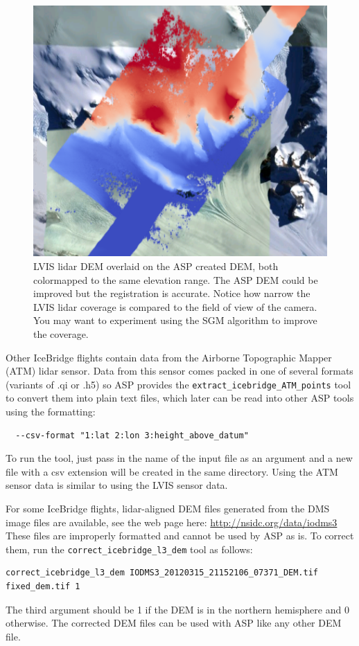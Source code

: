 \begin{figure}[h!]
\centering
  \includegraphics[width=5.5in]{images/examples/pinhole/icebridge_dem_overlay.png}
\caption{LVIS lidar DEM overlaid on the ASP created DEM, both colormapped to the same elevation range.
The ASP DEM could be improved but the registration is accurate.  Notice how narrow the LVIS lidar coverage
is compared to the field of view of the camera. You may want to experiment using the SGM algorithm to improve the coverage.}
\label{fig:pinhole-icebridge-orbitviz}
\end{figure}

Other IceBridge flights contain data from the Airborne Topographic Mapper (ATM) lidar sensor.  
Data from this sensor comes packed in one of several formats (variants of .qi or .h5) so
ASP provides the \texttt{extract\_icebridge\_ATM\_points} tool to convert them into plain
text files, which later can be read into other ASP tools using the formatting:
\begin{verbatim}
  --csv-format "1:lat 2:lon 3:height_above_datum"
\end{verbatim}
To run the tool, just pass in the name of the input file as an argument and a new file with a
csv extension will be created in the same directory.
Using the ATM sensor data is similar to using the LVIS sensor data.

For some IceBridge flights, lidar-aligned DEM files generated from the DMS
image files are available, see the web page here: \url{http://nsidc.org/data/iodms3}
These files are improperly formatted and cannot be used by ASP as is.  To correct them, run
the \texttt{correct\_icebridge\_l3\_dem} tool as follows:
\begin{verbatim}  
correct_icebridge_l3_dem IODMS3_20120315_21152106_07371_DEM.tif  fixed_dem.tif 1  
\end{verbatim}
The third argument should be 1 if the DEM is in the northern hemisphere and 0 otherwise.
The corrected DEM files can be used with ASP like any other DEM file.

